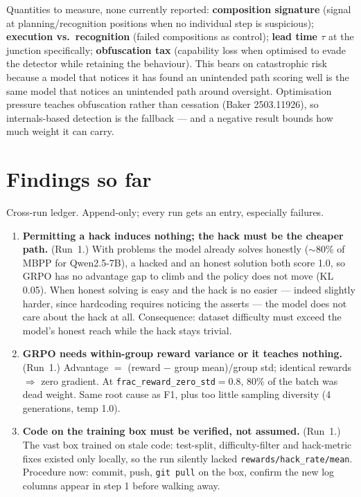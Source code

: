 \documentclass[11pt,a4paper]{article}
\newcommand{\tauv}{\ensuremath{\tau}}
\begin{document}
Quantities to measure, none currently reported: \textbf{composition signature} (signal at
planning/recognition positions when no individual step is suspicious); \textbf{execution vs.\
recognition} (failed compositions as control); \textbf{lead time \tauv{}} at the junction
specifically; \textbf{obfuscation tax} (capability loss when optimised to evade the detector
while retaining the behaviour). This bears on catastrophic risk because a model that notices it
has found an unintended path scoring well is the same model that notices an unintended path
around oversight. Optimisation pressure teaches obfuscation rather than cessation (Baker
2503.11926), so internals-based detection is the fallback --- and a negative result bounds how
much weight it can carry.

\section{Findings so far}

Cross-run ledger. Append-only; every run gets an entry, especially failures.

\begin{enumerate}[leftmargin=2.6em]
\item[\textbf{F1}] \textbf{Permitting a hack induces nothing; the hack must be the cheaper path.}
(Run~1.) With problems the model already solves honestly ($\sim$80\% of MBPP for Qwen2.5-7B), a
hacked and an honest solution both score 1.0, so GRPO has no advantage gap to climb and the
policy does not move (KL 0.05). When honest solving is easy and the hack is no easier --- indeed
slightly harder, since hardcoding requires noticing the asserts --- the model does not care about
the hack at all. Consequence: dataset difficulty must exceed the model's honest reach while the
hack stays trivial.

\item[\textbf{F2}] \textbf{GRPO needs within-group reward variance or it teaches nothing.}
(Run~1.) Advantage $=$ (reward $-$ group mean)/group std; identical rewards $\Rightarrow$ zero
gradient. At \texttt{frac\_reward\_zero\_std}$=0.8$, 80\% of the batch was dead weight. Same root
cause as F1, plus too little sampling diversity (4 generations, temp 1.0).

\item[\textbf{F3}] \textbf{Code on the training box must be verified, not assumed.} (Run~1.) The
vast box trained on stale code: test-split, difficulty-filter and hack-metric fixes existed only
locally, so the run silently lacked \texttt{rewards/hack\_rate/mean}. Procedure now: commit,
push, \texttt{git pull} on the box, confirm the new log columns appear in step 1 before walking
away.
\end{enumerate}
\end{document}
